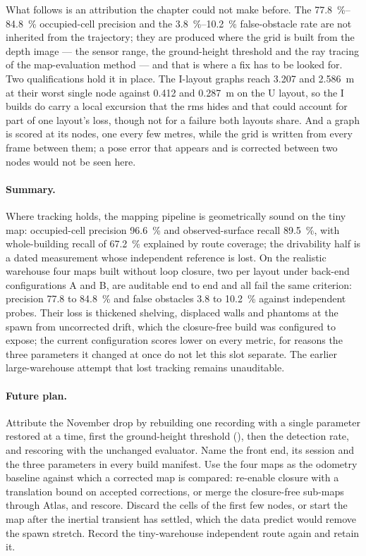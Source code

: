 \documentclass[11pt,a4paper,notitlepage]{report}
\begin{document}
What follows is an attribution the chapter could not make before. The
\SIrange{77.8}{84.8}{\percent} occupied-cell precision and the
\SIrange{3.8}{10.2}{\percent} false-obstacle rate are not inherited from the
trajectory; they are produced where the grid is built from the depth image ---
the sensor range, the ground-height threshold and the ray tracing of the
map-evaluation method --- and that is where a fix has to be looked for.
Two qualifications hold it in place. The I-layout graphs reach
\SI{3.207}{} and \SI{2.586}{\metre} at their worst single node against
\SI{0.412}{} and \SI{0.287}{\metre} on the U layout, so the I builds do carry
a local excursion that the rms hides and that could account for part of one
layout's loss, though not for a failure both layouts share. And a graph is
scored at its nodes, one every few metres, while the grid is written from every
frame between them; a pose error that appears and is corrected between two
nodes would not be seen here.


\paragraph{Summary.} Where tracking holds, the mapping pipeline is
geometrically sound on the tiny map: occupied-cell precision \SI{96.6}{\percent}
and observed-surface recall \SI{89.5}{\percent}, with whole-building recall of
\SI{67.2}{\percent} explained by route coverage; the drivability half is a dated
measurement whose independent reference is lost. On the realistic warehouse
four maps built without loop closure, two per layout under back-end
configurations A and B, are auditable end to end and all fail the same
criterion: precision 77.8 to \SI{84.8}{\percent} and false obstacles 3.8 to
\SI{10.2}{\percent} against independent probes. Their loss is thickened
shelving, displaced walls and phantoms at the spawn from uncorrected drift,
which the closure-free build was configured to expose; the current
configuration scores lower on every metric, for reasons the three parameters
it changed at once do not let this slot separate. The earlier large-warehouse
attempt that lost tracking remains unauditable.

\paragraph{Future plan.} Attribute the November drop by rebuilding one
recording with a single parameter restored at a time, first the ground-height
threshold (), then the detection rate, and rescoring
with the unchanged evaluator. Name the front end, its
session and the three parameters in every build manifest. Use the four maps as
the odometry baseline against which a corrected map is compared: re-enable
closure with a translation bound on accepted corrections, or merge the
closure-free sub-maps through Atlas, and rescore. Discard the cells of the
first few nodes, or start the map after the inertial transient has settled,
which the data predict would remove the spawn stretch. Record the
tiny-warehouse independent route again and retain it.
\end{document}
